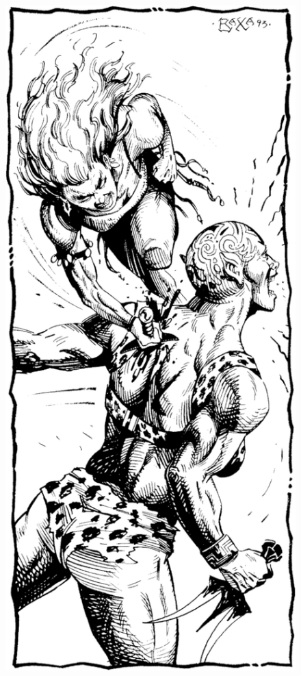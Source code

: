 
\begin{figure}[t!]
\centering
\includegraphics[width=\columnwidth-2mm]{images/killing-1.png}
\WOTC
\end{figure}
